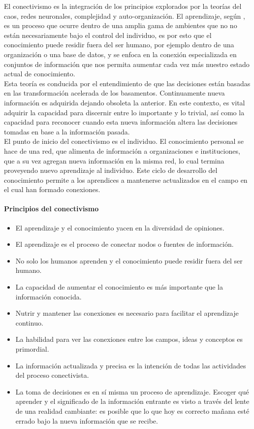 El conectivismo es la integración de los principios explorados por la teorías del caos, redes neuronales, complejidad y auto-organización. El aprendizaje, según \citeauthor{Conectivismo_Siemens2004}, es un proceso que ocurre dentro de una amplia gama de ambientes que no no están necesariamente bajo el control del individuo, es por esto que el conocimiento puede residir fuera del ser humano, por ejemplo dentro de una organización o una base de datos, y se enfoca en la conexión especializada en conjuntos de información que nos permita aumentar cada vez más nuestro estado actual de conocimiento.\\

Esta teoría es conducida por el entendimiento de que las decisiones están basadas en las transformación acelerada de los basamentos. Continuamente nueva información es adquirida dejando obsoleta la anterior. En este contexto, es vital adquirir la capacidad para discernir entre lo importante y lo trivial, así como la capacidad para reconocer cuando esta nueva información altera las decisiones tomadas en base a la información pasada.\\

El punto de inicio del conectivismo es el individuo. El conocimiento personal se hace de una red, que alimenta de información a organizaciones e instituciones, que a su vez agregan nueva información en la misma red, lo cual termina proveyendo nuevo aprendizaje al individuo. Este ciclo de desarrollo del conocimiento permite a los aprendices a mantenerse actualizados en el campo en el cual han formado conexiones.

\paragraph{Principios del conectivismo}
\begin{itemize}
	\item El aprendizaje y el conocimiento yacen en la diversidad de opiniones.
	\item El aprendizaje es el proceso de conectar nodos o fuentes de información.
	\item No solo los humanos aprenden y el conocimiento puede residir fuera del ser humano.
	\item La capacidad de aumentar el conocimiento es más importante que la información conocida.
	\item Nutrir y mantener las conexiones es necesario para facilitar el aprendizaje continuo.
	\item La habilidad para ver las conexiones entre los campos, ideas y conceptos es primordial.
	\item La información actualizada y precisa es la intención de todas las actividades del proceso conectivista.
	\item La toma de decisiones es en sí misma un proceso de aprendizaje. Escoger qué aprender y el significado de la información entrante es visto a través del lente de una realidad cambiante: es posible que lo que hoy es correcto mañana esté errado bajo la nueva información que se recibe.
\end{itemize}

